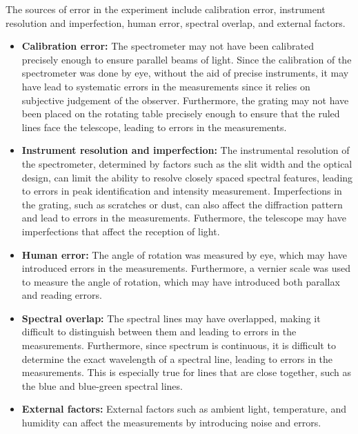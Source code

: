 \documentclass[10pt]{article}
\begin{document}
The sources of error in the experiment include calibration error, instrument resolution and imperfection, human error, spectral overlap, and external factors.

\begin{itemize}
  \item \textbf{Calibration error:} The spectrometer may not have been calibrated precisely enough to ensure parallel beams of light. Since the calibration of the spectrometer was done by eye, without the aid of precise instruments, it may have lead to systematic errors in the measurements since it relies on subjective judgement of the observer. Furthermore, the grating may not have been placed on the rotating table precisely enough to ensure that the ruled lines face the telescope, leading to errors in the measurements.
  
  \item \textbf{Instrument resolution and imperfection:} The instrumental resolution of the spectrometer, determined by factors such as the slit width and the optical design, can limit the ability to resolve closely spaced spectral features, leading to errors in peak identification and intensity measurement. Imperfections in the grating, such as scratches or dust, can also affect the diffraction pattern and lead to errors in the measurements. Futhermore, the telescope may have imperfections that affect the reception of light.
  
  \item \textbf{Human error:} The angle of rotation was measured by eye, which may have introduced errors in the measurements. Furthermore, a vernier scale was used to measure the angle of rotation, which may have introduced both parallax and reading errors. 
  
  \item \textbf{Spectral overlap:} The spectral lines may have overlapped, making it difficult to distinguish between them and leading to errors in the measurements. Furthermore, since spectrum is continuous, it is difficult to determine the exact wavelength of a spectral line, leading to errors in the measurements. This is especially true for lines that are close together, such as the blue and blue-green spectral lines.
  
  \item \textbf{External factors:} External factors such as ambient light, temperature, and humidity can affect the measurements by introducing noise and errors. 
\end{itemize}
\end{document}
